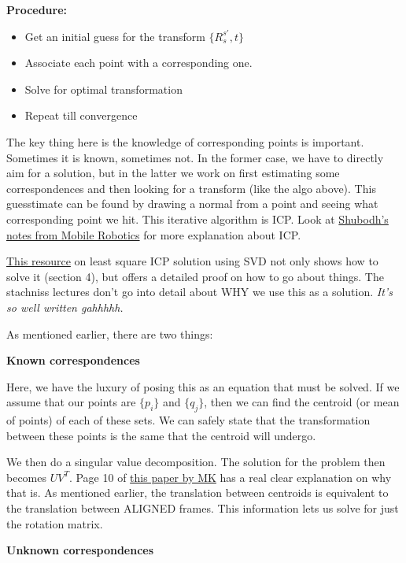 \textbf{Procedure:}

\begin{itemize}
    \item Get an initial guess for the transform $\{R^{s'}_{s}, t\}$
    \item Associate each point with a corresponding one.
    \item Solve for optimal transformation
    \item Repeat till convergence
\end{itemize}

The key thing here is the knowledge of corresponding points is important. Sometimes it is known, sometimes not. In the former case, we have to directly aim for a solution, but in the latter we work on first estimating some correspondences and then looking for a transform (like the algo above). This guesstimate can be found by drawing a normal from a point and seeing what corresponding point we hit. This iterative algorithm is ICP. Look at \href{https://www.notion.so/Point-Cloud-Registration-Iterative-Closest-Point-a25686ce1a11409d838d47bcac43ab4b}{Shubodh's notes from Mobile Robotics} for more explanation about ICP.

\href{https://igl.ethz.ch/projects/ARAP/svd\_rot.pdf}{This resource} on least square ICP solution using SVD not only shows how to solve it (section 4), but offers a detailed proof on how to go about things. The stachniss lectures don't go into detail about WHY we use this as a solution. \textit{It's so well written gahhhhh.}

As mentioned earlier, there are two things:

\textbf{Known correspondences}

Here, we have the luxury of posing this as an equation that must be solved. If we assume that our points are $\{p_i\}$ and $\{q_j\}$, then we can find the centroid (or mean of points) of each of these sets. We can safely state that the transformation between these points is the same that the centroid will undergo.

We then do a singular value decomposition. The solution for the problem then becomes $UV^T$. Page 10 of \href{https://arxiv.org/pdf/1705.09785.pdf}{this paper by MK} has a real clear explanation on why that is. As mentioned earlier, the translation between centroids is equivalent to the translation between ALIGNED frames. This information lets us solve for just the rotation matrix.

\textbf{Unknown correspondences}

